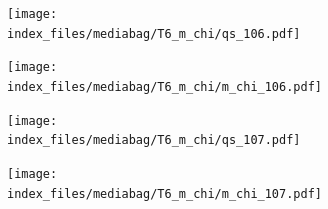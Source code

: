 \documentclass[
  11pt,
  letterpaper,
]{scrreprt}
\begin{document}
\begin{figure}

\begin{minipage}{0.50\linewidth}

\begin{figure}[H]

{\centering \texttt{[image: index\_files/mediabag/T6\_m\_chi/qs\_106.pdf]}

}


\end{figure}%

\end{minipage}%
%
\begin{minipage}{0.50\linewidth}

\begin{figure}[H]

{\centering \texttt{[image: index\_files/mediabag/T6\_m\_chi/m\_chi\_106.pdf]}

}


\end{figure}%

\end{minipage}%

\end{figure}%

\begin{figure}

\begin{minipage}{0.50\linewidth}

\begin{figure}[H]

{\centering \texttt{[image: index\_files/mediabag/T6\_m\_chi/qs\_107.pdf]}

}


\end{figure}%

\end{minipage}%
%
\begin{minipage}{0.50\linewidth}

\begin{figure}[H]

{\centering \texttt{[image: index\_files/mediabag/T6\_m\_chi/m\_chi\_107.pdf]}

}


\end{figure}%

\end{minipage}%

\end{figure}%
\end{document}
